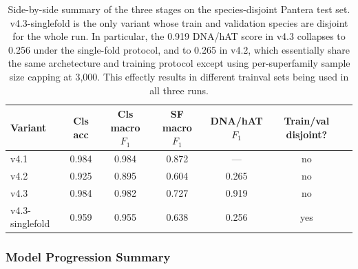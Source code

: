 \documentclass[12pt]{article}
\begin{document}
\begin{table}[h]
\centering
\small
\caption{Side-by-side summary of the three stages on the species-disjoint Pantera test set. v4.3-singlefold is the only variant whose train and validation species are disjoint for the whole run. In particular, the 0.919 DNA/hAT score in v4.3 collapses to 0.256 under the single-fold protocol, and to 0.265 in v4.2, which essentially share the same archetecture and training protocol except using per-superfamily sample size capping at 3{,}000. This effectly results in different trainval sets being used in all three runs. }
\label{tab:stage_compare}
\begin{tabular}{lcccccc}
\toprule
Variant & Cls acc & Cls macro $F_1$ & SF macro $F_1$ & DNA/hAT $F_1$ & Train/val disjoint? \\
\midrule
v4.1 & 0.984 & 0.984 & 0.872 & --- & no \\
v4.2 & 0.925 & 0.895 & 0.604 & 0.265 & no \\
v4.3 & 0.984 & 0.982 & 0.727 & 0.919 & no \\
v4.3-singlefold & 0.959 & 0.955 & 0.638 & 0.256 & yes \\
\bottomrule
\end{tabular}
\end{table}


\iffalse

\clearpage
\subsubsection{Model Progression Summary}
\end{document}
